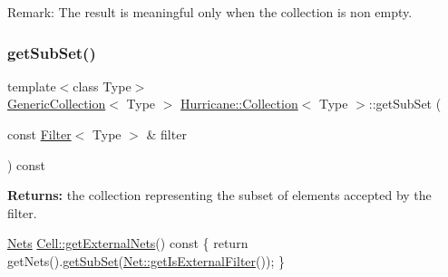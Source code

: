 \begin{DoxyParagraph}{Remark\+: The result is meaningful only when the collection is non }
empty. 
\end{DoxyParagraph}
\mbox{\label{classHurricane_1_1Collection_aa32ea7249d57ee05e3c71dcde8106832}} 
\subsubsection{\texorpdfstring{get\+Sub\+Set()}{getSubSet()}\hspace{0.1cm}{\footnotesize\ttfamily [1/3]}}
{\footnotesize\ttfamily template$<$class Type$>$ \\
\mbox{\hyperlink{classHurricane_1_1GenericCollection}{Generic\+Collection}}$<$ Type $>$ \mbox{\hyperlink{classHurricane_1_1Collection}{Hurricane\+::\+Collection}}$<$ Type $>$\+::get\+Sub\+Set (\begin{DoxyParamCaption}\item[{const \mbox{\hyperlink{classHurricane_1_1Filter}{Filter}}$<$ Type $>$ \&}]{filter }\end{DoxyParamCaption}) const\hspace{0.3cm}{\ttfamily [inline]}}

{\bfseries Returns\+:} the collection representing the subset of elements accepted by the filter. 
\begin{DoxyCode}
\mbox{\hyperlink{namespaceHurricane_a3404a8b17130a1824f4a281704b04df7}{Nets}} \mbox{\hyperlink{classHurricane_1_1Cell_aa80f3345db8c1395fa04a50737208793}{Cell::getExternalNets}}()\textcolor{keyword}{ const}
\textcolor{keyword}{}\{
   \textcolor{keywordflow}{return} getNets().\mbox{\hyperlink{classHurricane_1_1Collection_aa32ea7249d57ee05e3c71dcde8106832}{getSubSet}}(\mbox{\hyperlink{classHurricane_1_1Net_a3af91a80e219e37e70229e61dfd385da}{Net::getIsExternalFilter}}());
\}
\end{DoxyCode}
 \mbox{\label{classHurricane_1_1Collection_a91d986e21395d4021d927e06f204ab6c}} 
